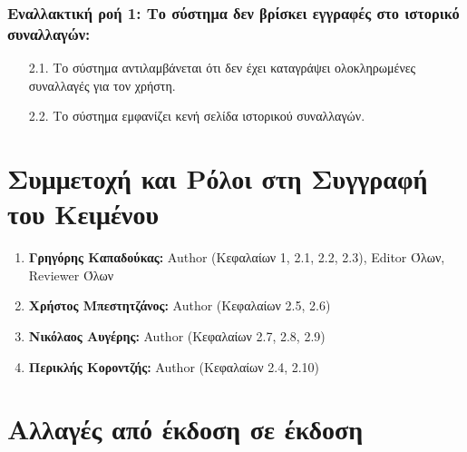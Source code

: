 \documentclass[12pt,a4paper]{article}
\begin{document}
\subsubsection*{Εναλλακτική ροή 1: Το σύστημα δεν βρίσκει εγγραφές στο ιστορικό συναλλαγών:}
\begin{enumerate}
    \item [2.1.] Το σύστημα αντιλαμβάνεται ότι δεν έχει καταγράψει ολοκληρωμένες συναλλαγές για τον χρήστη.
    \item [2.2.] Το σύστημα εμφανίζει κενή σελίδα ιστορικού συναλλαγών.
\end{enumerate}

\section{Συμμετοχή και Ρόλοι στη Συγγραφή του Κειμένου}
\begin{enumerate}
	\item \textbf{Γρηγόρης Καπαδούκας:} Author (Κεφαλαίων 1, 2.1, 2.2, 2.3), Editor Όλων, Reviewer Όλων
	\item \textbf{Χρήστος Μπεστητζάνος:} Author (Κεφαλαίων 2.5, 2.6)
   	\item \textbf{Νικόλαος Αυγέρης:} Author (Κεφαλαίων 2.7, 2.8, 2.9)
	\item \textbf{Περικλής Κοροντζής:} Author (Κεφαλαίων 2.4, 2.10)
\end{enumerate}
\section{Αλλαγές από έκδοση σε έκδοση}
\end{document}
